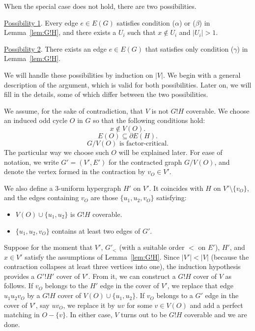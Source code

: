 \documentclass{article}
\theoremstyle{definition}
\begin{document}
When the special case does not hold, there are two possibilities.

\vspace{5pt}

\noindent \underline{Possibility 1}. Every edge $e \in E(G)$ satisfies condition ($\alpha$) or ($\beta$) in Lemma~\ref{lem:G!H}, and there exists a $U_i$ such that $x \notin U_i$ and $|U_i| > 1$.

\vspace{5pt}

\noindent \underline{Possibility 2}. There exists an edge $e \in E(G)$ that satisfies only condition ($\gamma$) in Lemma~\ref{lem:G!H}.

\vspace{5pt}

We will handle these possibilities by induction on $|V|$. We begin with a general description of the argument, which is valid for both possibilities. Later on, we will fill in the details, some of which differ between the two possibilities.

We assume, for the sake of contradiction, that $V$ is not $G!H$ coverable. We choose an induced odd cycle $O$ in $G$ so that the following conditions hold:
\begin{equation} \label{eq:noxo}
x \notin V(O).
\end{equation}
\begin{equation} \label{eq:osh}
E(O) \subseteq \partial E(H).
\end{equation}
\begin{equation} \label{eq:cfc}
G/V(O) \textrm{ is factor-critical}.
\end{equation}
The particular way we choose such $O$ will be explained later. For ease of notation, we write $G' = (V', E')$ for the contracted graph $G/V(O)$, and denote the vertex formed in the contraction by $v_O \in V'$.

We also define a $3$-uniform hypergraph $H'$ on $V'$. It coincides with $H$ on $V' \setminus \{v_O\}$, and the edges containing $v_O$ are those $\{u_1, u_2, v_O\}$ satisfying:
\begin{itemize}
    \item[-] $V(O) \cup \{u_1, u_2\}$ is $G!H$ coverable.
    \item[-] $\{ u_1, u_2, v_O\}$ contains at least two edges of $G'$.
\end{itemize}

Suppose for the moment that $V'$, $G'_<$ (with a suitable order $<$ on $E'$), $H'$, and $x \in V'$ satisfy the assumptions of Lemma~\ref{lem:G!H}. Since $|V'| < |V|$ (because the contraction collapses at least three vertices into one), the induction hypothesis provides a $G'!H'$ cover of $V'$. From it, we can construct a $G!H$ cover of $V$ as follows. If $v_O$ belongs to the $H'$ edge in the cover of $V'$, we replace that edge $u_1u_2v_O$ by a $G!H$ cover of $V(O) \cup \{u_1, u_2\}$. If $v_O$ belongs to a $G'$ edge in the cover of $V'$, say $uv_O$, we replace it by $uv$ for some $v \in V(O)$ and add a perfect matching in $O - \{v\}$. In either case, $V$ turns out to be $G!H$ coverable and we are done.
\end{document}
